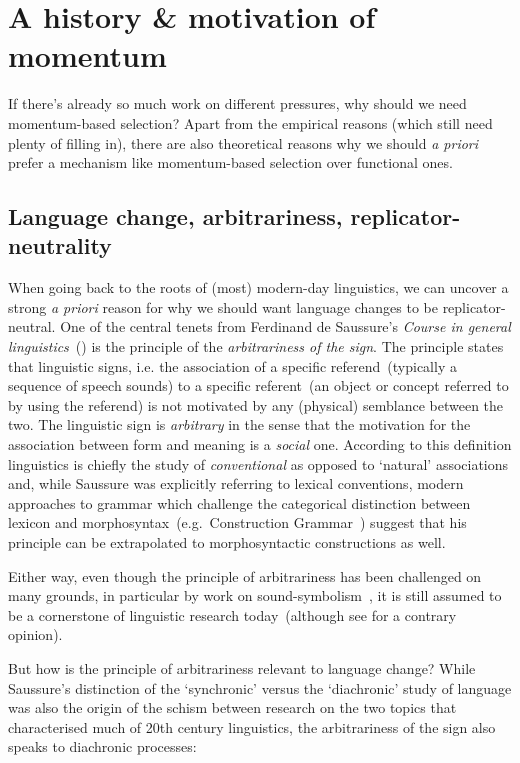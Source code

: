 \section{A history \& motivation of momentum}
\label{sec:history}

If there's already so much work on different pressures, why should we need momentum-based selection? Apart from the empirical reasons (which still need plenty of filling in), there are also theoretical reasons why we should \emph{a priori} prefer a mechanism like momentum-based selection over functional ones.

\subsection{Language change, arbitrariness, replicator-neutrality}

When going back to the roots of (most) modern-day linguistics, we can uncover a strong \emph{a priori} reason for why we should want language changes to be replicator-neutral. One of the central tenets from Ferdinand de Saussure's \emph{Course in general linguistics}~(\citeyear{Saussure1959}) is the principle of the \emph{arbitrariness of the sign}. The principle states that linguistic signs, i.e. the association of a specific referend~(typically a sequence of speech sounds) to a specific referent~(an object or concept referred to by using the referend) is not motivated by any (physical) semblance between the two. The linguistic sign is \emph{arbitrary} in the sense that the motivation for the association between form and meaning is a \emph{social} one.
According to this definition linguistics is chiefly the study of \emph{conventional} as opposed to `natural' associations and, while Saussure was explicitly referring to lexical conventions, modern approaches to grammar which challenge the categorical distinction between lexicon and morphosyntax~(e.g.~Construction Grammar~\citealt{Goldberg1995}) suggest that his principle can be extrapolated to morphosyntactic constructions as well.

Either way, even though the principle of arbitrariness has been challenged on many grounds, in particular by work on sound-symbolism~\citep[e.g.][]{Nygaard2009}, it is still assumed to be a cornerstone of linguistic research today~(although see \citealt{Joseph2000} for a contrary opinion).


But how is the principle of arbitrariness relevant to language change? While Saussure's distinction of the `synchronic' versus the `diachronic' study of language was also the origin of the schism between research on the two topics that characterised much of 20th century linguistics, the arbitrariness of the sign also speaks to diachronic processes:

